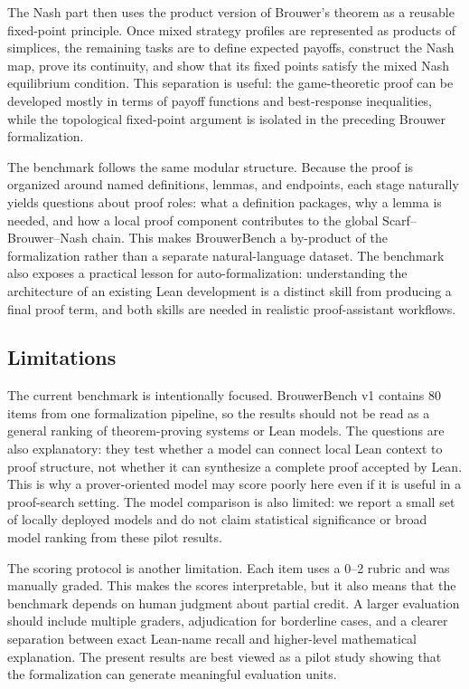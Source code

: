 \documentclass{article}
\theoremstyle{definition}
\begin{document}
The Nash part then uses the product version of Brouwer's theorem as a reusable fixed-point principle. Once mixed strategy profiles are represented as products of simplices, the remaining tasks are to define expected payoffs, construct the Nash map, prove its continuity, and show that its fixed points satisfy the mixed Nash equilibrium condition. This separation is useful: the game-theoretic proof can be developed mostly in terms of payoff functions and best-response inequalities, while the topological fixed-point argument is isolated in the preceding Brouwer formalization.

The benchmark follows the same modular structure. Because the proof is organized around named definitions, lemmas, and endpoints, each stage naturally yields questions about proof roles: what a definition packages, why a lemma is needed, and how a local proof component contributes to the global Scarf--Brouwer--Nash chain. This makes BrouwerBench a by-product of the formalization rather than a separate natural-language dataset. The benchmark also exposes a practical lesson for auto-formalization: understanding the architecture of an existing Lean development is a distinct skill from producing a final proof term, and both skills are needed in realistic proof-assistant workflows.

\subsection{Limitations}

The current benchmark is intentionally focused. BrouwerBench v1 contains 80 items from one formalization pipeline, so the results should not be read as a general ranking of theorem-proving systems or Lean models. The questions are also explanatory: they test whether a model can connect local Lean context to proof structure, not whether it can synthesize a complete proof accepted by Lean. This is why a prover-oriented model may score poorly here even if it is useful in a proof-search setting. The model comparison is also limited: we report a small set of locally deployed models and do not claim statistical significance or broad model ranking from these pilot results.

The scoring protocol is another limitation. Each item uses a 0--2 rubric and was manually graded. This makes the scores interpretable, but it also means that the benchmark depends on human judgment about partial credit. A larger evaluation should include multiple graders, adjudication for borderline cases, and a clearer separation between exact Lean-name recall and higher-level mathematical explanation. The present results are best viewed as a pilot study showing that the formalization can generate meaningful evaluation units.
\end{document}
